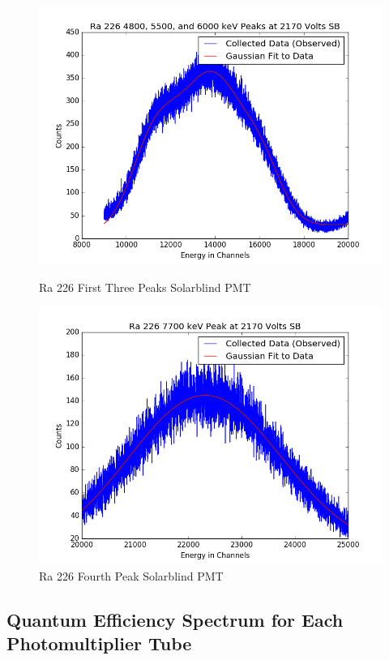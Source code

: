 \documentclass{article}
\begin{document}
\begin{figure}[H]
  \centering
  \begin{minipage}[b]{0.4\textwidth}
    \includegraphics[width=\textwidth]{SBRa1fit.png}
    \caption{Ra 226 First Three Peaks Solarblind PMT}
  \end{minipage}
  \hfill
  \begin{minipage}[b]{0.4\textwidth}
    \includegraphics[width=\textwidth]{SBRa4fit.png}
    \caption{Ra 226 Fourth Peak Solarblind PMT}
  \end{minipage}
\end{figure}

\subsection{Quantum Efficiency Spectrum for Each Photomultiplier Tube}
\end{document}
